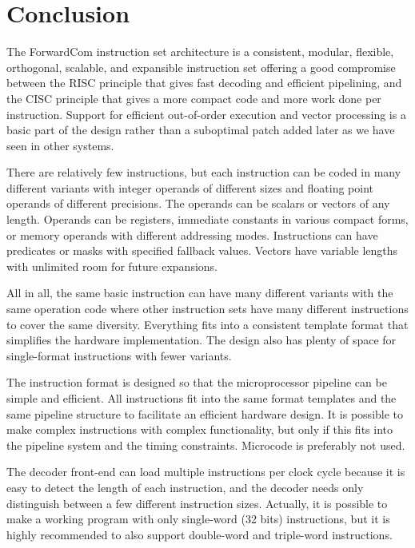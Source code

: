 \documentclass[forwardcom.tex]{subfiles}
\begin{document}
\RaggedRight

\chapter{Conclusion}
The ForwardCom instruction set architecture is a consistent, modular, 
flexible, orthogonal, scalable, and expansible instruction set offering a good compromise between the RISC principle that gives fast decoding and efficient pipelining, and the CISC principle that gives a more compact code and more work done per instruction. Support for efficient out-of-order execution and vector processing is a basic part of the design rather than a suboptimal patch added later as we have seen in other systems.
\vv

There are relatively few instructions, but each instruction can be coded in many different variants with integer operands of different sizes and floating point operands of different precisions. The operands can be scalars or vectors of any length. Operands can be registers, immediate constants in various compact forms, or memory operands with different addressing modes.  Instructions can have predicates or masks with specified fallback values. Vectors have variable lengths with unlimited room for future expansions.
\vv

All in all, the same basic instruction can have many different variants with the same operation code where other instruction sets have many different instructions to cover the same diversity. Everything fits into a consistent template format that simplifies the hardware implementation. The design also has plenty of space for single-format instructions with fewer variants. 
\vv

The instruction format is designed so that the microprocessor pipeline can be simple and efficient. All instructions fit into the same format templates and the same pipeline structure to facilitate an efficient hardware design. It is possible to make complex instructions with complex functionality, but only if this fits into the pipeline system and the timing constraints. Microcode is preferably not used.
\vv

The decoder front-end can load multiple instructions per clock cycle because it is easy to detect the length of each instruction, and the decoder needs only distinguish between a few different instruction sizes. Actually, it is 
possible to make a working program with only single-word (32 bits) instructions, but it is highly recommended to also support double-word and triple-word instructions. \vv
\end{document}
